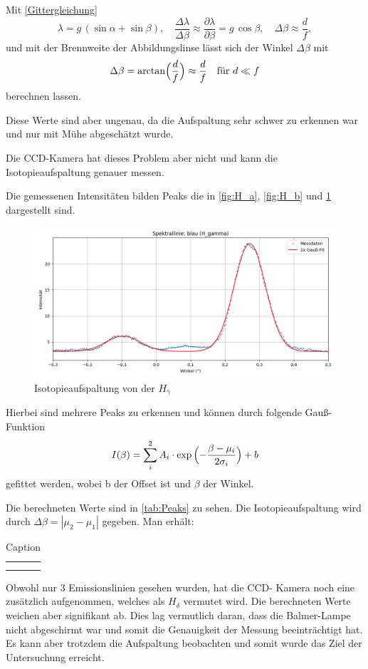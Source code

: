 Mit \cref{Gittergleichung}
\begin{equation}
  \lambda = g\,(\sin\alpha + \sin\beta),
  \quad
\frac{\Delta\lambda}{\Delta\beta} \approx 
  \frac{\partial\lambda}{\partial\beta} = g\,\cos\beta,
  \quad
  \Delta\beta \approx \frac{d}{f},
\end{equation}
und mit der Brennweite der Abbildungslinse lässt sich der Winkel $\Delta\beta$ mit 
\begin{equation}
    \Delta\beta = \arctan\Bigl(\frac{d}{f}\Bigr) \approx \frac{d}{f} \quad \text{für } d \ll f
\end{equation}
berechnen lassen.

Diese Werte sind aber ungenau, da die Aufspaltung sehr schwer zu erkennen war und nur mit Mühe abgeschätzt wurde.

Die CCD-Kamera hat dieses Problem aber nicht und kann die Isotopieaufspaltung genauer messen.

Die gemessenen Intensitäten bilden Peaks die in \cref{fig:H_a}, \cref{fig:H_b} und \cref{fig:H_g} dargestellt sind. 
\begin{figure}
    \centering
    \includegraphics[width=0.5\linewidth]{figs/dt_lila_145_51_5.png}
    \caption{Isotopieaufspaltung von der $H_{\gamma}$}
    \label{fig:H_g}
\end{figure}

Hierbei sind mehrere Peaks zu erkennen und können durch folgende Gauß-Funktion 
\begin{equation}
    I(\beta) = \sum_i^2 A_i \cdot \exp{\Bigl(-\frac{\beta-\mu_i}{2\sigma_i}}\Bigr) +b
\end{equation}
gefittet werden, wobei b der Offset ist und $\beta$ der Winkel. 

Die berechneten Werte sind in \cref{tab:Peaks} zu sehen.
Die Isotopieaufspaltung wird durch 
$\Delta\beta = |\mu_2 - \mu_1|$
gegeben. 
Man erhält:
\begin{table}[htbp]
    \centering
    \begin{tabular}{c|c}
         &  \\
         & 
    \end{tabular}
    \caption{Caption}
    \label{tab:my_label}
\end{table}
Obwohl nur 3 Emissionslinien gesehen wurden, hat die CCD- Kamera noch eine zusätzlich aufgenommen, welches als $H_\delta$ vermutet wird.
Die berechneten Werte weichen aber signifikant ab.
Dies lag vermutlich daran, dass die Balmer-Lampe nicht abgeschirmt war und somit die Genauigkeit der Messung beeinträchtigt hat. 
Es kann aber trotzdem die Aufspaltung beobachten und somit wurde das Ziel der Untersuchung erreicht.

